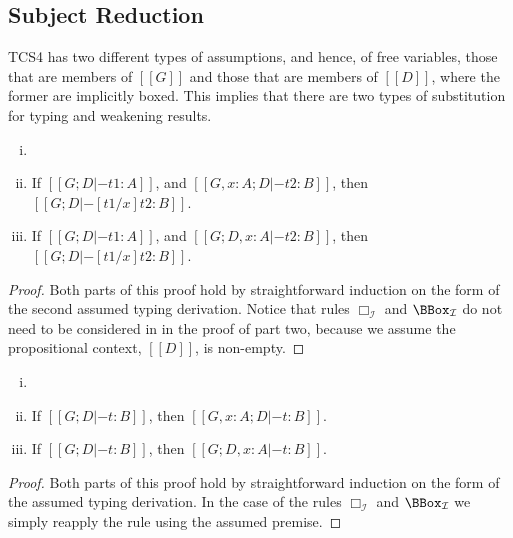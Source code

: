 \subsection{Subject Reduction}
\label{subsec:subject_reduction}
TCS4 has two different types of assumptions, and hence, of
free variables, those that are members of $[[G]]$ and those that are
members of $[[D]]$, where the former are implicitly boxed.  This
implies that there are two types of substitution for typing and
weakening results.
\begin{lemma}
  \label{lemma:substitution_for_typing}
  \begin{enumerate}[i.]
  \item[] 
  \item If $[[G;D |- t1 : A]]$, and $[[G, x : A; D |- t2 : B]]$, then $[[G;D |- [t1/x]t2 : B]]$.
  \item If $[[G;D |- t1 : A]]$, and $[[G; D, x : A |- t2 : B]]$, then $[[G;D |- [t1/x]t2 : B]]$.
  \end{enumerate}
\end{lemma}
\begin{proof}
  Both parts of this proof hold by straightforward induction on the
  form of the second assumed typing derivation.  Notice that rules
  $\Box_{\mathcal{I}}$ and $\BBox_{\mathcal{I}}$ do not need to be
  considered in in the proof of part two, because we assume the
  propositional context, $[[D]]$, is non-empty.
\end{proof}

\begin{lemma}[Weakening]
  \label{lemma:weakening}
  \begin{enumerate}[i.]
  \item[]
  \item If $[[G;D |- t : B]]$, then $[[G,x : A; D |- t : B]]$.
  \item If $[[G;D |- t : B]]$, then $[[G; D,x : A |- t : B]]$.
  \end{enumerate}
\end{lemma}
\begin{proof}
  Both parts of this proof hold by straightforward induction on the
  form of the assumed typing derivation.  In the case of the rules
  $\Box_{\mathcal{I}}$ and $\BBox_{\mathcal{I}}$ we simply reapply the
  rule using the assumed premise.
\end{proof}

